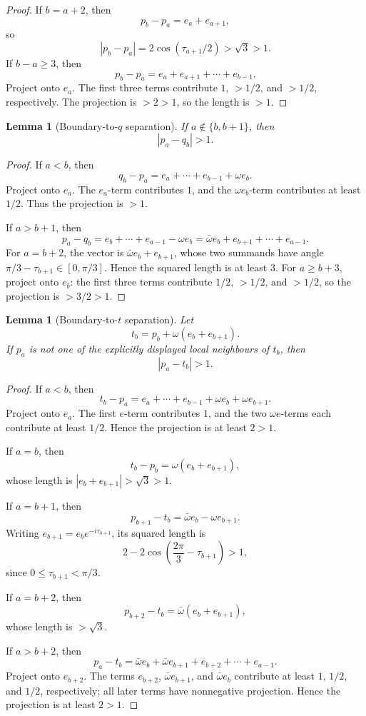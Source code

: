 \documentclass[11pt]{article}
\newtheorem{lemma}[theorem]{Lemma}
\begin{document}
\begin{proof}
If $b=a+2$, then
\[
 p_b-p_a=e_a+e_{a+1},
\]
so
\[
 |p_b-p_a|=2\cos(\tau_{a+1}/2)>\sqrt3>1.
\]
If $b-a\ge3$, then
\[
 p_b-p_a=e_a+e_{a+1}+\cdots+e_{b-1}.
\]
Project onto $e_a$. The first three terms contribute $1$, $>1/2$, and $>1/2$, respectively. The projection is $>2>1$, so the length is $>1$.
\end{proof}

\begin{lemma}[Boundary-to-$q$ separation]\label{lem:bq}
If $a\notin\{b,b+1\}$, then
\[
 |p_a-q_b|>1.
\]
\end{lemma}

\begin{proof}
If $a<b$, then
\[
 q_b-p_a=e_a+\cdots+e_{b-1}+\omega e_b.
\]
Project onto $e_a$. The $e_a$-term contributes $1$, and the $\omega e_b$-term contributes at least $1/2$. Thus the projection is $>1$.

If $a>b+1$, then
\[
 p_a-q_b=e_b+\cdots+e_{a-1}-\omega e_b
       =\bar\omega e_b+e_{b+1}+\cdots+e_{a-1}.
\]
For $a=b+2$, the vector is $\bar\omega e_b+e_{b+1}$, whose two summands have angle $\pi/3-\tau_{b+1}\in[0,\pi/3]$. Hence the squared length is at least $3$. For $a\ge b+3$, project onto $e_b$: the first three terms contribute $1/2$, $>1/2$, and $>1/2$, so the projection is $>3/2>1$.
\end{proof}

\begin{lemma}[Boundary-to-$t$ separation]\label{lem:bt}
Let
\[
 t_b=p_b+\omega(e_b+e_{b+1}).
\]
If $p_a$ is not one of the explicitly displayed local neighbours of $t_b$, then
\[
 |p_a-t_b|>1.
\]
\end{lemma}

\begin{proof}
If $a<b$, then
\[
 t_b-p_a=e_a+\cdots+e_{b-1}+\omega e_b+\omega e_{b+1}.
\]
Project onto $e_a$. The first $e$-term contributes $1$, and the two $\omega e$-terms each contribute at least $1/2$. Hence the projection is at least $2>1$.

If $a=b$, then
\[
 t_b-p_b=\omega(e_b+e_{b+1}),
\]
whose length is $|e_b+e_{b+1}|>\sqrt3>1$.

If $a=b+1$, then
\[
 p_{b+1}-t_b=\bar\omega e_b-\omega e_{b+1}.
\]
Writing $e_{b+1}=e_be^{-i\tau_{b+1}}$, its squared length is
\[
 2-2\cos\left(\frac{2\pi}{3}-\tau_{b+1}\right)>1,
\]
since $0\le\tau_{b+1}<\pi/3$.

If $a=b+2$, then
\[
 p_{b+2}-t_b=\bar\omega(e_b+e_{b+1}),
\]
whose length is $>\sqrt3$.

If $a>b+2$, then
\[
 p_a-t_b=\bar\omega e_b+\bar\omega e_{b+1}+e_{b+2}+\cdots+e_{a-1}.
\]
Project onto $e_{b+2}$. The terms $e_{b+2}$, $\bar\omega e_{b+1}$, and $\bar\omega e_b$ contribute at least $1$, $1/2$, and $1/2$, respectively; all later terms have nonnegative projection. Hence the projection is at least $2>1$.
\end{proof}
\end{document}
